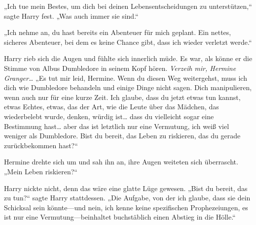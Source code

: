 „Ich tue mein Bestes, um dich bei deinen Lebensentscheidungen zu unterstützen,“ sagte Harry fest. „Was auch immer sie sind.“

„Ich nehme an, du hast bereits ein Abenteuer für mich geplant. Ein nettes, sicheres Abenteuer, bei dem es keine Chance gibt, dass ich wieder verletzt werde.“

Harry rieb sich die Augen und fühlte sich innerlich müde. Es war, als könne er die Stimme von Albus Dumbledore in seinem Kopf hören.
\emph{Verzeih mir, Hermine Granger…}
„Es tut mir leid, Hermine. Wenn du diesen Weg weitergehst, muss ich dich wie Dumbledore behandeln und einige Dinge nicht sagen. Dich manipulieren, wenn auch nur für eine kurze Zeit. Ich glaube, dass du jetzt etwas tun kannst, etwas Echtes, etwas, das der Art, wie die Leute über das Mädchen, das wiederbelebt wurde, denken, würdig ist… dass du vielleicht sogar eine Bestimmung hast… aber das ist letztlich nur eine Vermutung, ich weiß viel weniger als Dumbledore. Bist du bereit, das Leben zu riskieren, das du gerade zurückbekommen hast?“

Hermine drehte sich um und sah ihn an, ihre Augen weiteten sich überrascht. „Mein Leben riskieren?“

Harry nickte nicht, denn das wäre eine glatte Lüge gewesen.
„Bist du bereit, das zu tun?“ sagte Harry stattdessen. „Die Aufgabe, von der ich glaube, dass sie dein Schicksal sein könnte—und nein, ich kenne keine spezifischen Prophezeiungen, es ist nur eine Vermutung—beinhaltet buchstäblich einen Abstieg in die Hölle.“

